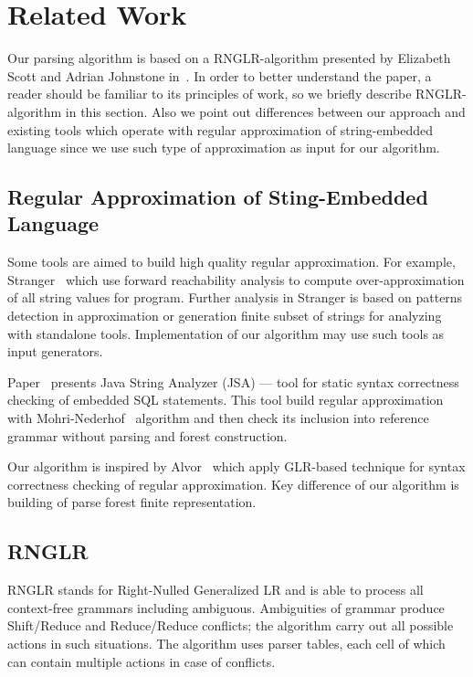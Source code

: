 \documentclass{llncs}
\begin{document}
\section{Related Work}
Our parsing algorithm is based on a RNGLR-algorithm presented by Elizabeth Scott 
and Adrian Johnstone in~\cite{RNGLR}. In order to better understand the paper, a reader 
should be familiar to its principles of work, so we briefly describe RNGLR-algorithm 
in this section.  Also we point out differences between our approach and existing
tools which operate with regular approximation of string-embedded language since
we use such type of approximation as input for our algorithm.

\subsection{Regular Approximation of Sting-Embedded Language}
Some tools are aimed to build high quality regular approximation. For example, 
Stranger~\cite{Stranger} which use forward reachability analysis to compute 
over-approximation of all string values for program. Further analysis in Stranger 
is based on patterns detection in approximation or generation finite subset of 
strings for analyzing with standalone tools. Implementation of our algorithm may 
use such tools as input generators.

Paper~\cite{JSA} presents Java String Analyzer (JSA) — tool for static syntax 
correctness checking of embedded SQL statements.  This tool build regular approximation 
with Mohri-Nederhof~\cite{MohriNederhof} algorithm and then check its inclusion into reference grammar 
without parsing and forest construction.
 
Our algorithm is inspired by Alvor~\cite{Alvor} which apply GLR-based technique 
for syntax correctness checking of regular approximation. Key difference of our 
algorithm is building of parse forest finite representation. 

\subsection{RNGLR}
RNGLR stands for Right-Nulled Generalized LR and is able to process all context-free 
grammars including ambiguous. Ambiguities of grammar produce Shift/Reduce and 
Reduce/Reduce conflicts; the algorithm carry out all possible actions in such situations. 
The algorithm uses parser tables, each cell of which can contain multiple actions 
in case of conflicts. 
\end{document}
